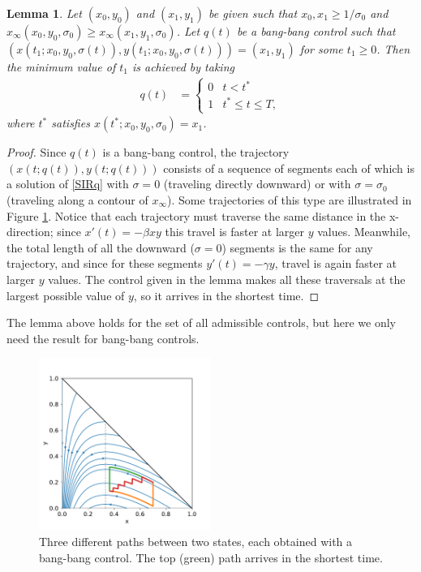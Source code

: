 \documentclass[english,12pt]{article}
\newtheorem{lem}{Lemma}
\newcommand{\Rnot}{\sigma_0}
\newcommand{\Sinf}{x_\infty}
\begin{document}
\begin{lem} \label{lem:shortest-path}
Let $(x_0,y_0)$ and $(x_1,y_1)$ be given such that $x_0, x_1 \ge 1/\Rnot$ and
$\Sinf(x_0,y_0,\Rnot)\ge\Sinf(x_1,y_1,\Rnot)$.
Let $q(t)$ be a bang-bang control such that $(x(t_1;x_0,y_0,\sigma(t)),y(t_1;x_0,y_0,\sigma(t)))=(x_1,y_1)$
for some $t_1\ge0$.  Then the minimum value of $t_1$ is achieved by taking
\begin{align}
    q(t) & = \begin{cases}  
        0 & t<t^* \\
        1 & t^* \le  t \le T,
    \end{cases}
\end{align}
where $t^*$ satisfies $x(t^*;x_0,y_0,\Rnot)=x_1$.
\end{lem}
\begin{proof}
Since $q(t)$ is a bang-bang control, the trajectory $(x(t;q(t)),y(t;q(t)))$ 
consists of a sequence of segments each of which is a solution of
\eqref{SIRq} with $\sigma=0$ (traveling directly downward) or with $\sigma=\sigma_0$
(traveling along a contour of $x_\infty$).  Some trajectories of this type are
illustrated in Figure \ref{fig:bangbangtraj}.  Notice that each trajectory must
traverse the same distance in the x-direction; since $x'(t)=-\beta xy$ this
travel is faster at larger $y$ values.  Meanwhile, the total length of all the
downward ($\sigma=0$) segments is the same for any trajectory, and since for
these segments $y'(t) = -\gamma y$, travel is again faster at larger $y$ values.
The control given in the lemma makes all these traversals at the largest
possible value of $y$, so it arrives in the shortest time.
\end{proof}
The lemma above holds for the set of all admissible controls, but here we
only need the result for bang-bang controls.

\begin{figure}
    \centering
    \includegraphics[width=0.5\textwidth]{figures/threepaths.pdf}
    \caption{Three different paths between two states, each obtained
    with a bang-bang control.  The top (green) path arrives in the shortest time.\label{fig:bangbangtraj}}
\end{figure}
\end{document}
